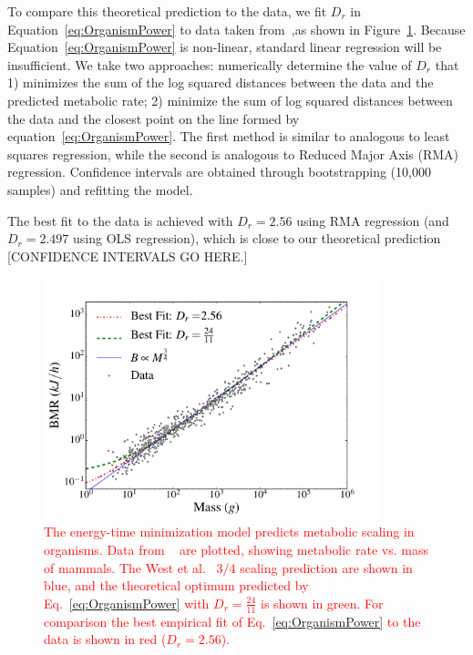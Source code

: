\documentclass[12pt]{article}
\newcommand{\red}[1]{\textcolor{red}{#1}}
\begin{document}
To compare this theoretical prediction to the data, we fit $D_r$ in
Equation~\ref{eq:OrganismPower} to data taken
from~\cite{kolokotrones2010curvature},as shown in
Figure~\ref{fig:OrganismsPowerScaling}. Because Equation~\ref{eq:OrganismPower}
is non-linear, standard linear regression will be insufficient. We take two
approaches: numerically determine the value of $D_r$ that 1) minimizes the sum
of the log squared distances between the data and the predicted metabolic rate;
2) minimize the sum of log squared distances between the data and the closest
point on the line formed by equation~\ref{eq:OrganismPower}. The first method
is similar to analogous to least squares regression, while the second is
analogous to Reduced Major Axis (RMA) regression. Confidence intervals are
obtained through bootstrapping (10,000 samples) and refitting the model. 

The best fit to
the data is achieved with $D_r = 2.56$ using RMA regression (and $D_r
= 2.497$ using OLS regression), which is close to our theoretical
prediction [CONFIDENCE INTERVALS GO HERE.]  

 
\begin{figure}[!h] \centering
  \includegraphics[height=70mm]{Figures/OrganismsPowerScalingv2.pdf}

  \caption{\red{The energy-time minimization model predicts metabolic
    scaling in organisms. Data from ~\cite{kolokotrones2010curvature}
    are plotted, showing metabolic rate vs. mass of mammals.  The West et
    al.~\cite{west97} $3/4$ scaling prediction are shown in blue, and
    the theoretical optimum predicted by Eq.~\ref{eq:OrganismPower}
    with $D_r = \frac{24}{11}$ is shown in green.  For comparison the
    best empirical fit of  Eq.~\ref{eq:OrganismPower} to the data is
    shown in red ($D_r = 2.56$). }}
\label{fig:OrganismsPowerScaling}
\end{figure}
\end{document}

